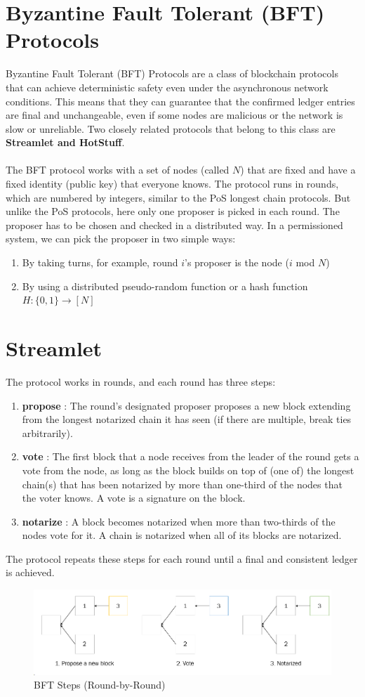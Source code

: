 \section{Byzantine Fault Tolerant (BFT) Protocols}
Byzantine Fault Tolerant (BFT) Protocols are a class of blockchain protocols that can achieve deterministic safety even under the asynchronous network conditions. This means that they can guarantee that the confirmed ledger entries are final and unchangeable, even if some nodes are malicious or the network is slow or unreliable. Two closely related protocols that belong to this class are \textbf{Streamlet and HotStuff}.\\\\
The BFT protocol works with a set of nodes (called $N$) that are fixed and have a fixed identity (public key) that everyone knows.
The protocol runs in rounds, which are numbered by integers, similar to the PoS longest chain protocols. But unlike the PoS protocols, here only one proposer is picked in each round. The proposer has to be chosen and checked in a distributed way. In a permissioned system, we can pick the proposer in two simple ways:
\begin{enumerate}
	\item By taking turns, for example, round $i$’s proposer is the node ($i$ mod $N$)
	\item By using a distributed pseudo-random function or a hash function $H : \{0, 1\} \rightarrow [N]$
\end{enumerate}

\section{Streamlet}
The protocol works in rounds, and each round has three steps:
\begin{enumerate}
	\item \textbf{propose} : The round's designated proposer proposes a new block extending from the longest notarized chain it has seen (if there are multiple, break ties arbitrarily).
	\item \textbf{vote} : The first block that a node receives from the leader of the round gets a vote from the node, as long as the block builds on top of (one of) the longest chain(s) that has been notarized by more than one-third of the nodes that the voter knows. A vote is a signature on the block.
	\item \textbf{notarize} : A block becomes notarized when more than two-thirds of the nodes vote for it. A chain is notarized when all of its blocks are notarized.
\end{enumerate}
The protocol repeats these steps for each round until a final and consistent ledger is achieved.
\begin{figure}
	\centering
	\includegraphics[width=0.7\linewidth]{Fig/15/F1}
	\caption{BFT Steps (Round-by-Round)}
	\label{fig:L15_f1}
\end{figure}
